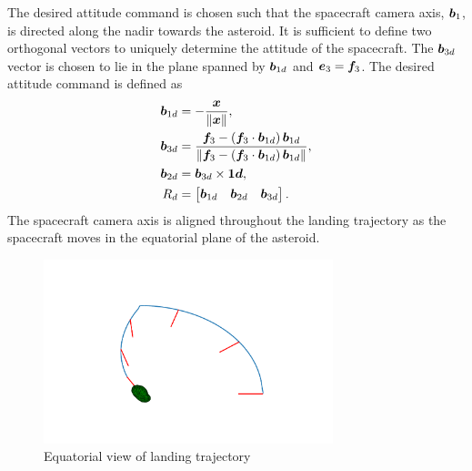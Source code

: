 \documentclass[letterpaper, paper,11pt]{AAS}		%
\begin{document}
The desired attitude command is chosen such that the spacecraft camera axis, \( \bm{b}_1 \), is directed along the nadir towards the asteroid.
It is sufficient to define two orthogonal vectors to uniquely determine the attitude of the spacecraft.
The \( \bm{b}_{3d} \) vector is chosen to lie in the plane spanned by \(\bm{b}_{1d} \) and \( \bm{e}_3 = \bm{f}_3 \).
The desired attitude command is defined as
\begin{align}
    \bm{b}_{1d} &= - \frac{\bm{x}}{\left\| \bm{x} \right\|} , \\
    \bm{b}_{3d} &= \frac{\bm{f}_3 - \left( \bm{f}_3 \cdot \bm{b}_{1d} \right) \bm{b}_{1d}}{\left\| \bm{f}_3 - \left( \bm{f}_3 \cdot \bm{b}_{1d} \right) \bm{b}_{1d} \right\|}, \\
    \bm{b}_{2d} &= \bm{b}_{3d} \times \bm{1d} , \\
R_d &= \begin{bmatrix} \bm{b}_{1d} & \bm{b}_{2d} & \bm{b}_{3d} \end{bmatrix} .
\end{align}
The spacecraft camera axis is aligned throughout the landing trajectory as the spacecraft moves in the equatorial plane of the asteroid.
\begin{figure}[htbp]
    \centering
    \includegraphics[width=0.75\textwidth]{figures/traj_fig.pdf}
    \caption{Equatorial view of landing trajectory\label{fig:true_landing_trajectory}}
\end{figure}
\end{document}
